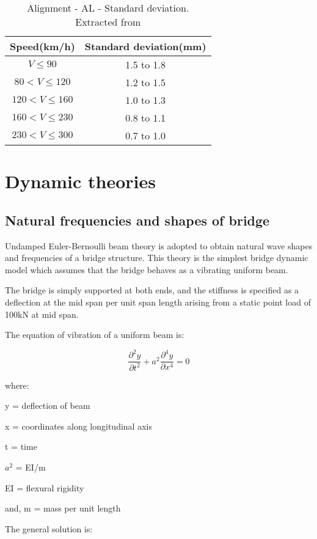 \begin{appendices}
\begin{table}[h]
    \centering
    \caption{Alignment - AL - Standard deviation. Extracted from \citet[Table B.6]{13848}}
    \begin{tabular}{cc}
        \hline
        Speed(km/h) & Standard deviation(mm) \\
        \hline
        $V\leq 90$ & 1.5 to 1.8 \\
        $80 < V \leq 120$ & 1.2 to 1.5 \\
        $120 < V \leq 160$ & 1.0 to 1.3 \\
        $160 <V \leq 230$ & 0.8 to 1.1 \\
        $230 <V \leq 300$ & 0.7 to 1.0 \\
        \hline
    \end{tabular}
    \label{tab:lateraldeviation}
\end{table}


\section{Dynamic theories}

\subsection{Natural frequencies and shapes of bridge}
Undamped Euler-Bernoulli beam theory is adopted to obtain natural wave shapes and frequencies of a bridge structure. This theory is the simplest bridge dynamic model which assumes that the bridge behaves as a vibrating uniform beam. 

The bridge is simply supported at both ends, and the stiffness is specified as a deflection at the mid span per unit span length arising from a static point load of 100kN at mid span.

The equation of vibration of a uniform beam is:

$$\frac{\partial^2 y}{\partial t^2} + a^2\frac{\partial^4 y}{\partial x^4}=0$$

where: 

y = deflection of beam

x = coordinates along longitudinal axis

t = time 

$a^2$ = EI/m

EI = flexural rigidity

and, m = mass per unit length

The general solution is:


\end{appendices}
